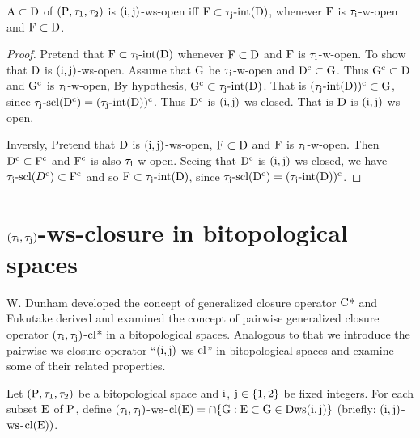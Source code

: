 \begin{thm}\label{thm8.3.3}
$\mathrm{A} \subset \mathrm{D}$ of $(\mathrm{P}, \tau_1, \tau_2 )$ is $(\mathrm{i}, \mathrm{j})$-ws-open iff $\mathrm{F}\subset \tau_{\mathrm{j}}\text{-int}(\mathrm{D})$, whenever $\mathrm{F}$ is $\tau_{\mathrm{i}}$-w-open and $\mathrm{F}\subset \mathrm{D}$.
\end{thm}

\begin{proof}
Pretend that $\mathrm{F}\subset \tau_{\mathrm{i}}\text{-int}(\mathrm{D})$ whenever $\mathrm{F}\subset \mathrm{D}$ and $\mathrm{F}$ is $\tau_{\mathrm{i}}$-w-open. To show that $\mathrm{D}$ is $(\mathrm{i}, \mathrm{j})$-ws-open. Assume that $\mathrm{G}$ be $\tau_{\mathrm{i}}$-w-open and $\mathrm{D}^{\text{c}} \subset \mathrm{G}$. Thus $\mathrm{G}^{\text{c}} \subset \mathrm{D}$ and $\mathrm{G}^{\text{c}}$ is $\tau_{\mathrm{i}}$-w-open, By hypothesis, $\mathrm{G}^{\text{c}} \subset \tau_{\mathrm{j}}\text{-int}(\mathrm{D})$. That is $(\tau_{\mathrm{j}}\text{-int}(\mathrm{D}))^{\text{c}} \subset \mathrm{G}$, since $\tau_{\mathrm{j}}\text{-scl}(\mathrm{D}^{\text{c}})=(\tau_{\mathrm{j}}\text{-int}(\mathrm{D}))^{\text{c}}$. Thus $\mathrm{D}^{\text{c}}$ is $(\mathrm{i}, \mathrm{j})$-ws-closed. That is $\mathrm{D}$ is $(\mathrm{i}, \mathrm{j})$-ws-open. 

Inversly, Pretend that $\mathrm{D}$ is $(\mathrm{i}, \mathrm{j})$-ws-open, $\mathrm{F}\subset\mathrm{D}$ and $\mathrm{F}$ is $\tau_{\mathrm{i}}$-w-open. Then $\mathrm{D}^{\text{c}} \subset \mathrm{F}^{\text{c}}$ and $\mathrm{F}^{\text{c}}$ is also $\tau_{\mathrm{i}}$-w-open. Seeing that $\mathrm{D}^{\text{c}}$ is $(\mathrm{i}, \mathrm{j})$-ws-closed, we have $\tau_{\mathrm{j}}\text{-scl}(D^{\text{c}}) \subset \mathrm{F}^{\text{c}}$ and so $\mathrm{F}\subset \tau_{\mathrm{j}}\text{-int}(\mathrm{D})$, since $\tau_{\mathrm{j}}\text{-scl}(\mathrm{D}^{\text{c}}) = (\tau_{\mathrm{j}}\text{-int}(\mathrm{D}))^{\text{c}}$.
\end{proof}

\section[$(\tau_{\TSi}, \tau_{\TSj} )$-ws-closure in bitopological spaces]{\boldmath$(\tau_{\TSi}, \tau_{\TSj} )$-ws-closure in bitopological spaces}\label{sec8.4}

W. Dunham \cite{key} developed the concept of generalized closure operator $\mathrm{C}$* and Fukutake \cite{Fukutake2} derived and examined the concept of pairwise generalized closure operator $(\tau_{\TSi},\tau_{\TSj} )$-$\mathrm{cl}$* in a bitopological spaces. Analogous to that we introduce the pairwise ws-closure operator ``$(\mathrm{i}, \mathrm{j})$-ws-$\mathrm{cl}$'' in bitopological spaces and examine some of their related properties.

\begin{dfn}\label{defi8.4.1}
Let $(\mathrm{P}, \tau_1, \tau_2 )$ be a bitopological space and $\mathrm{i}$, $\mathrm{j}\in\{1, 2\}$ be fixed integers. For each subset $\mathrm{E}$ of $\mathrm{P}$, define $(\tau_{\TSi}, \tau_{\TSj} )$-$\mathrm{ws}$-$\mathrm{cl}(\mathrm{E})= \cap \{\mathrm{G}: \mathrm{E} \subset \mathrm{G}\in\mathrm{D} \mathrm{ws} (\mathrm{i}, \mathrm{j})\}$ (briefly: $(\mathrm{i}, \mathrm{j})$-$\mathrm{ws}$-$\mathrm{cl}(\mathrm{E}))$.
\end{dfn}

